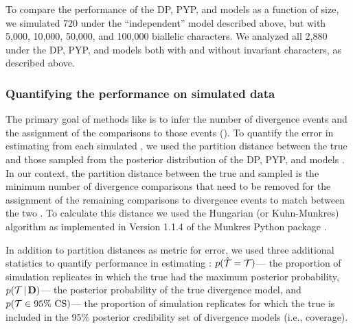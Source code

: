 \documentclass[letterpaper,12pt]{article}
\begin{document}
To compare the performance of the DP, PYP, and \wunif models as a function of
\dataset size, we simulated 720
\datasets under the ``independent'' model described above, but
with 5,000, 10,000, 50,000, and 100,000 biallelic characters.
We analyzed all 2,880 \datasets under the DP, PYP, and \wunif models
both with and without invariant characters, as
described above.

\subsubsection{Quantifying the performance on simulated data}

The primary goal of methods like \ecoevolity is to infer the number of
divergence events and the assignment of the comparisons to those events
(\etimesets).
To quantify the error in estimating \etimesets from each simulated \dataset, we
used the partition distance between the true \etimesets and those sampled from
the posterior distribution of the DP, PYP, and \wunif models
\citep{Regnier1983,Gusfield2002}.
In our context, the partition distance between the true and sampled \etimesets
is the minimum number of divergence comparisons that need to be removed for the
assignment of the remaining comparisons to divergence events to match between
the two \etimesets.
To calculate this distance we used the Hungarian (or Kuhn-Munkres) algorithm
\citep{Kuhn1955,Munkres1957}
as implemented in Version 1.1.4 of the Munkres Python package
\citep{Clapper2020}.

In addition to partition distances as metric for \etimesets error, we used
three additional statistics to quantify performance in estimating \etimesets:
$p(\hat{\mathcal{T}} =\mathcal{T})$---
    the proportion of simulation replicates in which the true \etimesets had
    the maximum posterior probability,
$p(\mathcal{T} \,|\, \mathbf{D})$---
    the posterior probability of the true divergence model,
and
$p(\mathcal{T} \in \textrm{95\% CS})$---
    the proportion of simulation replicates for which the true \etimesets is
    included in the 95\% posterior credibility set of divergence models (i.e.,
    coverage).
\end{document}
